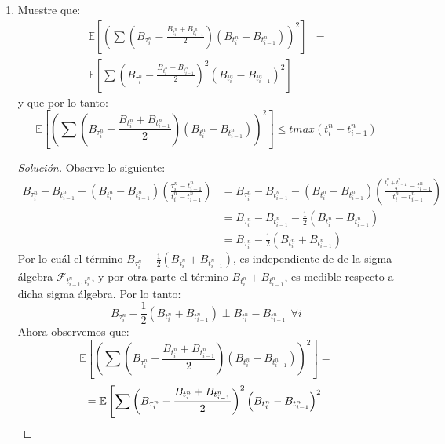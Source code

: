 \documentclass[11pt,notitlepage]{article}
\newenvironment{solucion}
  {\begin{proof}[Solución]}
  {\end{proof}}
\begin{document}
\begin{enumerate}
\begin{solucion}
    \end{solucion}
    \item Muestre que: 
    \begin{align*}
        \mathbb{E}\left[\left(\sum\left(B_{\tau_{i}^{n}} - \frac{B_{t_{i}^{n}}+ B_{t_{i-1}^{n}}}{2} \right)\left(B_{t_{i}^{n}}- B_{t_{i-1}^{n}}\right)\right)^2\right]
        &=\\ 
        \mathbb{E}\left[\sum\left(B_{\tau_{i}^{n}} - \frac{B_{t_{i}^{n}}+ B_{t_{i-1}^{n}}}{2} \right)^{2}\left(B_{t_{i}^{n}}- B_{t_{i-1}^{n}}\right)^2\right]
    \end{align*}
    y que por lo tanto: 
    \[\mathbb{E}\left[\left(\sum\left(B_{\tau_{i}^{n}} - \frac{B_{t_{i}^{n}}+ B_{t_{i-1}^{n}}}{2} \right)\left(B_{t_{i}^{n}}- B_{t_{i-1}^{n}}\right)\right)^2\right] \leq tmax(t_{i}^{n} -  t_{i-1}^{n} )\]
    \begin{solucion}
    Observe lo siguiente:
    \begin{align*}
        B_{\tau_{i}^n}-B_{t_{i-1}^n} - \left(B_{t_{i}^n}-B_{t_{i-1}^n}\right)\left(\frac{\tau_{i}^n - t_{i-1}^n}{t_{i}^n-t_{i-1}^n}\right)&= B_{\tau_{i}^n}-B_{t_{i-1}^n} - \left( B_{t_{i}^n}-B_{t_{i-1}^n}\right)\left(\frac{\frac{t_{i}^n+t_{i-1}^n}{2} - t_{i-1}^n}{t_{i}^n-t_{i-1}^n}\right)\\
        &= B_{\tau_{i}^n}-B_{t_{i-1}^n} - \frac{1}{2}( B_{t_{i}^n}-B_{t_{i-1}^n})\\
        &=  B_{\tau_{i}^n}-\frac{1}{2}( B_{t_{i}^n}+B_{t_{i-1}^n}) 
    \end{align*}
    Por lo cuál el término \( B_{\tau_{i}^n}-\frac{1}{2}( B_{t_{i}^n}+B_{t_{i-1}^n})\), es independiente de de la sigma álgebra \(\mathcal{F}_{t_{i-1}^n,t_{i}^n}\), y por otra parte el término \(B_{t_{i}^n}+B_{t_{i-1}^n}\), es medible respecto a dicha sigma álgebra. Por lo tanto: 
    \begin{equation}\label{St.4}
     B_{\tau_{i}^n}-\frac{1}{2}( B_{t_{i}^n}+B_{t_{i-1}^n}) \perp B_{t_{i}^n}-B_{t_{i-1}^n} \ \ \forall i   
    \end{equation}
    Ahora observemos que: 
    \begin{equation*}
        \mathbb{E}\left[\left(\sum\left(B_{\tau_{i}^{n}} - \frac{B_{t_{i}^{n}}+ B_{t_{i-1}^{n}}}{2} \right)\left(B_{t_{i}^{n}}- B_{t_{i-1}^{n}}\right)\right)^2\right]= 
    \end{equation*}
    \[
        = \mathbb{E}\left[\sum\left(B_{\tau_{i}^{n}} - \frac{B_{t_{i}^{n}}+ B_{t_{i-1}^{n}}}{2} \right)^{2}\left(B_{t_{i}^{n}}- B_{t_{i-1}^{n}}\right)^2\right.\\
\]
\end{solucion}
\end{enumerate}
\end{document}
